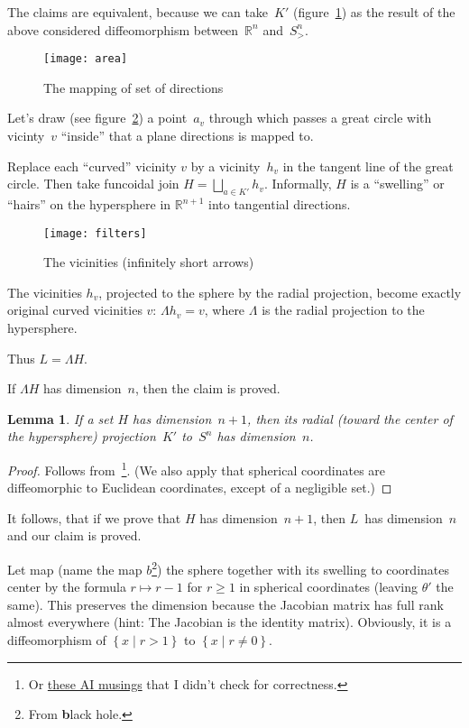 \documentclass[oneside,draft]{amsart}
\newcommand{\setcond}[2]{\left\{#1\mid#2\right\}}
\newtheorem{lem}{Lemma}
\begin{document}
The claims are equivalent, because we can take~$K'$ (figure~\ref{fig:area}) as the result of the above considered diffeomorphism between~$\mathbb{R}^n$ and~$S^n_{>}$.

\begin{figure}[hbt]
    \centering
    \texttt{[image: area]}
    \caption{The mapping of set of directions}
    \label{fig:area}
\end{figure}

Let's draw (see figure~\ref{fig:filters}) a point~$a_v$ through which passes a great circle with vicinty~$v$ ``inside'' that a plane directions is mapped to.

Replace each ``curved'' vicinity $v$ by a vicinity~$h_v$ in the tangent line of the great circle. Then take funcoidal join $H=\bigsqcup_{a\in K'}h_v$. Informally, $H$ is a ``swelling'' or ``hairs'' on the hypersphere in $\mathbb{R}^{n+1}$ into tangential directions.

\begin{figure}[hbt]
    \centering
    \texttt{[image: filters]}
    \caption{The vicinities (infinitely short arrows)}
    \label{fig:filters}
\end{figure}

The vicinities $h_v$, projected to the sphere by the radial projection, become exactly original curved vicinities $v$: $\Lambda h_v=v$, where $\Lambda$ is the radial projection to the hypersphere.

Thus $L = \Lambda H$.

If $\Lambda H$ has dimension~$n$, then the claim is proved.

\begin{lem}
If a set $H$ has dimension~$n+1$, then its radial (toward the center of the hypersphere) projection~$K'$ to~$S^n$ has dimension~$n$.
\end{lem}

\begin{proof}
Follows from~\cite{189275}\footnote{Or \href{https://grok.com/share/bGVnYWN5_2e0aef8b-4309-420f-815c-a09d76ae97c1}{these AI musings}
that I didn't check for correctness.}.
(We also apply that spherical coordinates are diffeomorphic to Euclidean coordinates, except of a negligible set.)
\end{proof}

It follows, that if we prove that $H$ has dimension~$n+1$, then $L$~has dimension~$n$ and our claim is proved.

Let map (name the map $b$\footnote{From \textbf{b}lack hole.}) the sphere together with its swelling to coordinates center by the formula $r\mapsto r-1$ for $r\geq 1$ in spherical coordinates (leaving $\theta'$ the same).
This preserves the dimension because the Jacobian matrix has full rank almost everywhere (hint: The Jacobian is the identity matrix).
Obviously, it is a diffeomorphism of $\setcond{x}{r>1}$ to $\setcond{x}{r\ne 0}$.
\end{document}
